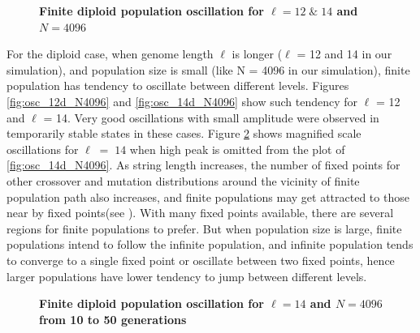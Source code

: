 \begin{figure}[h]
\begin{center}
\caption{\textbf{Finite diploid population oscillation for $\ell = 12 \;\&\; 14$ and $N = 4096$}}
\label{oscillation_12d_14d_N4096}
\end{center}
\end{figure}

For the diploid case, when genome length $\ell$ is longer ($\ell$ = 12 and 14 in our simulation), 
and population size is small (like N = 4096 in our simulation), finite population has tendency to 
oscillate between different levels. Figures \ref{fig:osc_12d_N4096} and \ref{fig:osc_14d_N4096} show such tendency for 
$\ell$ = 12 and $\ell$ = 14. Very good oscillations with small amplitude were observed in temporarily stable states 
in these cases. Figure \ref{oscillation_14d_N4096} shows magnified scale oscillations for $\ell \;=\; 14$ 
when high peak is omitted from the plot of \ref{fig:osc_14d_N4096}. 
As string length increases, the number of fixed points for other crossover and mutation distributions 
around the vicinity of finite population path also increases, 
and finite populations may get attracted to those near by fixed points(see \cite{Vose1999}). 
With many fixed points available, 
there are several regions for finite populations to prefer. 
But when population size is large, finite populations intend to follow the infinite population, 
and infinite population tends to 
converge to a single fixed point or oscillate between two fixed points, hence  
larger populations have lower tendency to jump between different levels.
\clearpage

\begin{figure}[htp]
\begin{center}
 \hspace{-3em}%
\caption{\textbf{Finite diploid population oscillation for $\ell = 14$ and $N = 4096$ from 10 to 50 generations}}
\label{oscillation_14d_N4096}
\end{center}
\end{figure}


